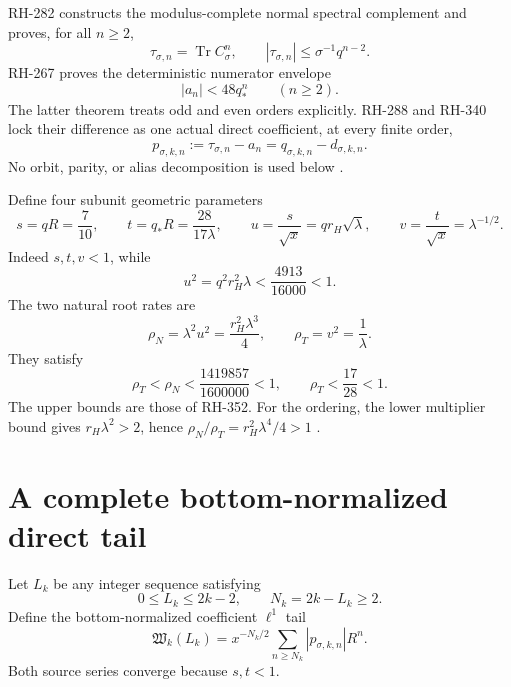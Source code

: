 \documentclass[11pt]{article}
\theoremstyle{remark}
\begin{document}
RH-282 constructs the modulus-complete normal spectral complement and proves,
for all $n\ge2$,
\begin{equation}\label{eq:tau-cap}
 \tau_{\sigma,n}=\operatorname{Tr}C_\sigma^n,
 \qquad |\tau_{\sigma,n}|\le\sigma^{-1}q^{n-2}.
\end{equation}
RH-267 proves the deterministic numerator envelope
\begin{equation}\label{eq:a-cap}
 |a_n|<48q_*^n\qquad(n\ge2).
\end{equation}
The latter theorem treats odd and even orders explicitly.  RH-288 and RH-340
lock their difference as one actual direct coefficient, at every finite order,
\begin{equation}\label{eq:p-type}
 \boxed{p_{\sigma,k,n}:=\tau_{\sigma,n}-a_n
 =q_{\sigma,k,n}-d_{\sigma,k,n}.}
\end{equation}
No orbit, parity, or alias decomposition is used below
\citep{WangSpectralTail2026,WangUnifiedEnvelope2026,WangGluing2026,
WangSynchronization2026}.

Define four subunit geometric parameters
\begin{equation}\label{eq:geometric}
 s=qR=\frac7{10},\qquad
 t=q_*R=\frac{28}{17\lambda},\qquad
 u=\frac{s}{\sqrt x}=qr_H\sqrt\lambda,
 \qquad v=\frac{t}{\sqrt x}=\lambda^{-1/2}.
\end{equation}
Indeed $s,t,v<1$, while
\[
 u^2=q^2r_H^2\lambda
 <\frac{4913}{16000}<1.
\]
The two natural root rates are
\begin{equation}\label{eq:rates}
 \rho_N=\lambda^2u^2=\frac{r_H^2\lambda^3}{4},
 \qquad \rho_T=v^2=\frac1\lambda.
\end{equation}
They satisfy
\begin{equation}\label{eq:rate-certificates}
 \rho_T<\rho_N<\frac{1419857}{1600000}<1,
 \qquad \rho_T<\frac{17}{28}<1.
\end{equation}
The upper bounds are those of RH-352.  For the ordering, the lower multiplier
bound gives $r_H\lambda^2>2$, hence
$\rho_N/\rho_T=r_H^2\lambda^4/4>1$
\citep{WangModulusCancellation2026}.

\section{A complete bottom-normalized direct tail}

Let $L_k$ be any integer sequence satisfying
\begin{equation}\label{eq:depth-domain}
 0\le L_k\le2k-2,
 \qquad N_k=2k-L_k\ge2.
\end{equation}
Define the bottom-normalized coefficient $\ell^1$ tail
\begin{equation}\label{eq:W}
 \mathfrak W_k(L_k)
 =x^{-N_k/2}\sum_{n\ge N_k}|p_{\sigma,k,n}|R^n.
\end{equation}
Both source series converge because $s,t<1$.
\end{document}
